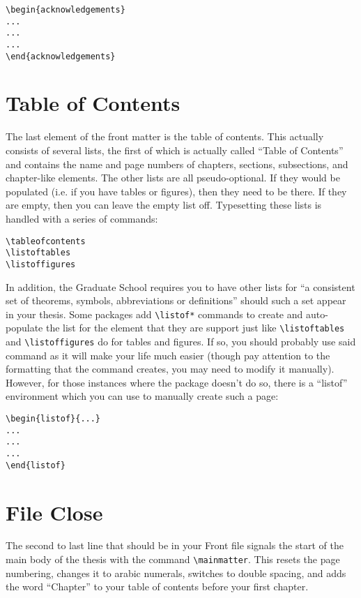 \begin{verbatim}
\begin{acknowledgements}
...
...
...
\end{acknowledgements}
\end{verbatim}

\section{Table of Contents}
The last element of the front matter is the table of contents.  This actually consists of several lists, the first of which is actually called ``Table of Contents'' and contains the name and page numbers of chapters, sections, subsections, and chapter-like elements.  The other lists are all pseudo-optional.  If they would be populated (i.e. if you have tables or figures), then they need to be there.  If they are empty, then you can leave the empty list off.  Typesetting these lists is handled with a series of commands:

\begin{verbatim}
\tableofcontents
\listoftables
\listoffigures
\end{verbatim}

In addition, the Graduate School requires you to have other lists for ``a consistent set of theorems, symbols, abbreviations or definitions'' should such a set appear in your thesis.  Some packages add \verb=\listof*= commands to create and auto-populate the list for the element that they are support just like \verb=\listoftables= and \verb=\listoffigures= do for tables and figures.  If so, you should probably use said command as it will make your life much easier (though pay attention to the formatting that the command creates, you may need to modify it manually).  However, for those instances where the package doesn't do so, there is a ``listof'' environment which you can use to manually create such a page:

\begin{verbatim}
\begin{listof}{...}
...
...
...
\end{listof}
\end{verbatim}

\section{File Close}
The second to last line that should be in your Front file signals the start of the main body of the thesis with the command \verb=\mainmatter=.  This resets the page numbering, changes it to arabic numerals, switches to double spacing, and adds the word ``Chapter'' to your table of contents before your first chapter.

